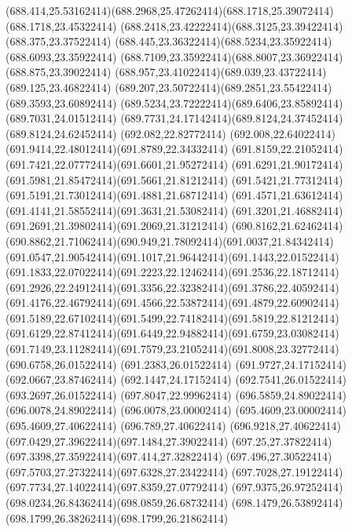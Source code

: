 {{	\curveto(688.414,25.53162414)(688.2968,25.47262414)(688.1718,25.39072414)
	\lineto(688.1718,23.45322414)
	\curveto(688.2418,23.42222414)(688.3125,23.39422414)(688.375,23.37522414)
	\curveto(688.445,23.36322414)(688.5234,23.35922414)(688.6093,23.35922414)
	\curveto(688.7109,23.35922414)(688.8007,23.36922414)(688.875,23.39022414)
	\curveto(688.957,23.41022414)(689.039,23.43722414)(689.125,23.46822414)
	\curveto(689.207,23.50722414)(689.2851,23.55422414)(689.3593,23.60892414)
	\curveto(689.5234,23.72222414)(689.6406,23.85892414)(689.7031,24.01512414)
	\curveto(689.7731,24.17142414)(689.8124,24.37452414)(689.8124,24.62452414)
	\closepath
	\moveto(692.082,22.82772414)
	\curveto(692.008,22.64022414)(691.9414,22.48012414)(691.8789,22.34332414)
	\curveto(691.8159,22.21052414)(691.7421,22.07772414)(691.6601,21.95272414)
	\curveto(691.6291,21.90172414)(691.5981,21.85472414)(691.5661,21.81212414)
	\curveto(691.5421,21.77312414)(691.5191,21.73012414)(691.4881,21.68712414)
	\curveto(691.4571,21.63612414)(691.4141,21.58552414)(691.3631,21.53082414)
	\curveto(691.3201,21.46882414)(691.2691,21.39802414)(691.2069,21.31212414)
	\lineto(690.8162,21.62462414)
	\curveto(690.8862,21.71062414)(690.949,21.78092414)(691.0037,21.84342414)
	\curveto(691.0547,21.90542414)(691.1017,21.96442414)(691.1443,22.01522414)
	\curveto(691.1833,22.07022414)(691.2223,22.12462414)(691.2536,22.18712414)
	\curveto(691.2926,22.24912414)(691.3356,22.32382414)(691.3786,22.40592414)
	\curveto(691.4176,22.46792414)(691.4566,22.53872414)(691.4879,22.60902414)
	\curveto(691.5189,22.67102414)(691.5499,22.74182414)(691.5819,22.81212414)
	\curveto(691.6129,22.87412414)(691.6449,22.94882414)(691.6759,23.03082414)
	\curveto(691.7149,23.11282414)(691.7579,23.21052414)(691.8008,23.32772414)
	\lineto(690.6758,26.01522414)
	\lineto(691.2383,26.01522414)
	\lineto(691.9727,24.17152414)
	\lineto(692.0667,23.87462414)
	\lineto(692.1447,24.17152414)
	\lineto(692.7541,26.01522414)
	\lineto(693.2697,26.01522414)
	\closepath
	\moveto(697.8047,22.99962414)
	\lineto(696.5859,24.89022414)
	\lineto(696.0078,24.89022414)
	\lineto(696.0078,23.00002414)
	\lineto(695.4609,23.00002414)
	\lineto(695.4609,27.40622414)
	\lineto(696.789,27.40622414)
	\curveto(696.9218,27.40622414)(697.0429,27.39622414)(697.1484,27.39022414)
	\curveto(697.25,27.37822414)(697.3398,27.35922414)(697.414,27.32822414)
	\curveto(697.496,27.30522414)(697.5703,27.27322414)(697.6328,27.23422414)
	\curveto(697.7028,27.19122414)(697.7734,27.14022414)(697.8359,27.07792414)
	\curveto(697.9375,26.97252414)(698.0234,26.84362414)(698.0859,26.68732414)
	\curveto(698.1479,26.53892414)(698.1799,26.38262414)(698.1799,26.21862414)
}}
